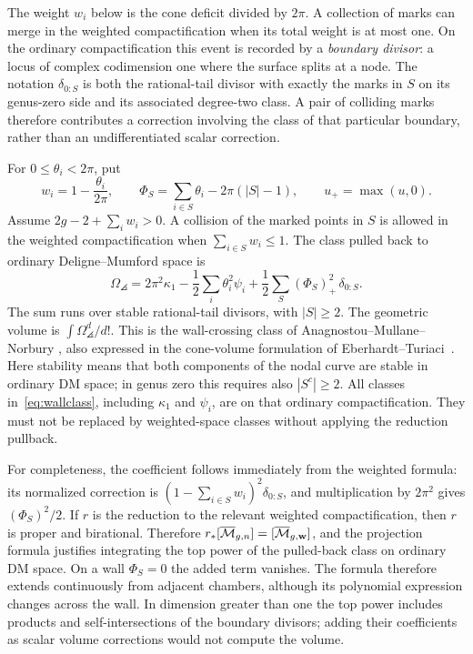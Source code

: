 The weight $w_i$ below is the cone deficit divided by $2\pi$.
A collection of marks can merge in the weighted compactification
when its total weight is at most one. On the ordinary
compactification this event is recorded by a \emph{boundary divisor}:
a locus of complex codimension one where the surface splits at a
node. The notation $\delta_{0:S}$ is both the rational-tail divisor
with exactly the marks in $S$ on its genus-zero side and its
associated degree-two class. A pair of colliding marks therefore
contributes a correction involving the class of that particular
boundary, rather than an undifferentiated scalar correction.

For $0\le\theta_i<2\pi$, put
\[
 w_i=1-\frac{\theta_i}{2\pi},\qquad
 \Phi_S=\sum_{i\in S}\theta_i-2\pi(|S|-1),\qquad u_+=\max(u,0).
\]
Assume $2g-2+\sum_iw_i>0$. A collision of the marked points in $S$ is
allowed in the weighted compactification when $\sum_{i\in S}w_i\le1$.
The class pulled back to ordinary Deligne--Mumford space is
\begin{equation}
 \boxed{
 \Omega_{\angles}=2\pi^2\kappa_1-\frac12\sum_i\theta_i^2\psi_i
      +\frac12\sum_S(\Phi_S)_+^2\,\delta_{0:S}.}
 \label{eq:wallclass}
\end{equation}
The sum runs over stable rational-tail divisors, with $|S|\ge2$. The
geometric volume is $\int\Omega_{\angles}^{d}/d!$. This is the
wall-crossing class of Anagnostou--Mullane--Norbury
\cite[Definitions 2.12--2.13 and Lemma 2.14]{AMN}, also expressed in the
cone-volume formulation of Eberhardt--Turiaci~\cite{ET}.
Here stability means that both components of the nodal curve are stable
in ordinary DM space; in genus zero this requires also $|S^c|\ge2$.
All classes in~\eqref{eq:wallclass}, including $\kappa_1$ and $\psi_i$,
are on that ordinary compactification. They must not be replaced by
weighted-space classes without applying the reduction pullback.

For completeness, the coefficient follows immediately from the weighted
formula: its normalized correction is
$(1-\sum_{i\in S}w_i)^2\delta_{0:S}$, and multiplication by $2\pi^2$
gives $(\Phi_S)^2/2$. If $r$ is the reduction to the relevant weighted
compactification, then $r$ is proper and birational. Therefore
$r_*[\overline{\mathcal M}_{g,n}]=[\overline{\mathcal M}_{g,\mathbf w}]$, and the projection formula justifies
integrating the top power of the pulled-back class on ordinary DM space.
On a wall $\Phi_S=0$ the added term vanishes. The formula therefore
extends continuously from adjacent chambers, although its polynomial
expression changes across the wall. In dimension greater than one the
top power includes products and self-intersections of the boundary
divisors; adding their coefficients as scalar volume corrections would
not compute the volume.

